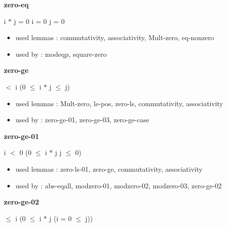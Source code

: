 \documentclass[a4paper]{article}
\begin{document}
\medskip

\bigskip

{\large\bf zero-eq}

\medskip

 \Fol i $*$ j = 0 \Equiv i = 0 \Or j = 0

\begin{itemize}


\item       used lemmas  : commutativity, associativity, Mult-zero, eq-nonzero
\item       used by      : modeqp, square-zero

\end{itemize}

\medskip

\bigskip

{\large\bf zero-ge}

\medskip

  $<$ i \Imp (0 $\le$ i $*$ j  $\le$ j)

\begin{itemize}


\item       used lemmas  : Mult-zero, le-pos, zero-ls, commutativity, associativity
\item       used by      : zero-ge-01, zero-ge-03, zero-ge-case

\end{itemize}

\medskip

\bigskip

{\large\bf zero-ge-01}

\medskip

 \Fol i $<$ 0 \Imp (0 $\le$ i $*$ j \Equiv j $\le$ 0)

\begin{itemize}


\item       used lemmas  : zero-ls-01, zero-ge, commutativity, associativity
\item       used by      : abs-eqall, modzero-01, modzero-02, modzero-03, zero-ge-02

\end{itemize}

\medskip

\bigskip

{\large\bf zero-ge-02}

\medskip

  $\le$ i \Imp (0 $\le$ i $*$ j \Equiv \Not \Not (i = 0  $\le$ j))
\end{document}
